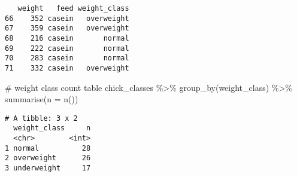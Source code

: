 \documentclass[
  letterpaper,
  DIV=11,
  numbers=noendperiod]{scrreprt}
\newenvironment{Shaded}{\begin{snugshade}}{\end{snugshade}}
\newcommand{\AttributeTok}[1]{\textcolor[rgb]{0.40,0.45,0.13}{#1}}
\newcommand{\CommentTok}[1]{\textcolor[rgb]{0.37,0.37,0.37}{#1}}
\newcommand{\FunctionTok}[1]{\textcolor[rgb]{0.28,0.35,0.67}{#1}}
\newcommand{\NormalTok}[1]{\textcolor[rgb]{0.00,0.23,0.31}{#1}}
\newcommand{\SpecialCharTok}[1]{\textcolor[rgb]{0.37,0.37,0.37}{#1}}
\begin{document}
\begin{verbatim}
   weight   feed weight_class
66    352 casein   overweight
67    359 casein   overweight
68    216 casein       normal
69    222 casein       normal
70    283 casein       normal
71    332 casein   overweight
\end{verbatim}

\begin{Shaded}
\begin{Highlighting}[]
\CommentTok{\# weight class count table }
\NormalTok{chick\_classes }\SpecialCharTok{\%\textgreater{}\%} 
  \FunctionTok{group\_by}\NormalTok{(weight\_class) }\SpecialCharTok{\%\textgreater{}\%}
  \FunctionTok{summarise}\NormalTok{(}\AttributeTok{n =} \FunctionTok{n}\NormalTok{())}
\end{Highlighting}
\end{Shaded}

\begin{verbatim}
# A tibble: 3 x 2
  weight_class     n
  <chr>        <int>
1 normal          28
2 overweight      26
3 underweight     17
\end{verbatim}
\end{document}
